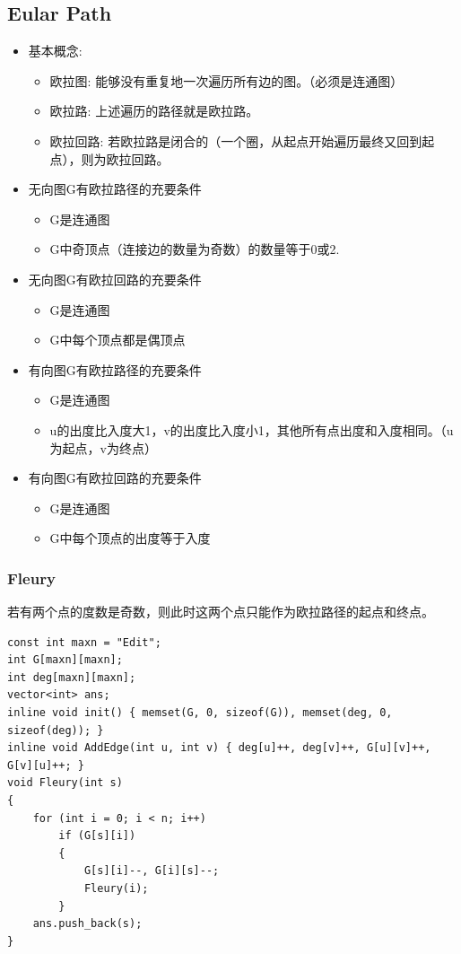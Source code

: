 \documentclass[twoside]{article}
\begin{document}
\subsection{Eular Path}
\begin{itemize}
\item  基本概念:
    \begin{itemize}
    \item 欧拉图: 能够没有重复地一次遍历所有边的图。（必须是连通图）
    \item 欧拉路: 上述遍历的路径就是欧拉路。
    \item 欧拉回路: 若欧拉路是闭合的（一个圈，从起点开始遍历最终又回到起点），则为欧拉回路。
    \end{itemize}
\item 无向图G有欧拉路径的充要条件
    \begin{itemize}
    \item G是连通图
    \item G中奇顶点（连接边的数量为奇数）的数量等于0或2.
    \end{itemize}
\item 无向图G有欧拉回路的充要条件
    \begin{itemize}
    \item G是连通图
    \item G中每个顶点都是偶顶点
    \end{itemize}
\item 有向图G有欧拉路径的充要条件
    \begin{itemize}
    \item G是连通图
    \item u的出度比入度大1，v的出度比入度小1，其他所有点出度和入度相同。（u为起点，v为终点）
    \end{itemize}
\item 有向图G有欧拉回路的充要条件
    \begin{itemize}
    \item G是连通图
    \item G中每个顶点的出度等于入度
    \end{itemize}
\end{itemize}

\subsubsection{Fleury}

若有两个点的度数是奇数，则此时这两个点只能作为欧拉路径的起点和终点。
\begin{lstlisting}
const int maxn = "Edit";
int G[maxn][maxn];
int deg[maxn][maxn];
vector<int> ans;
inline void init() { memset(G, 0, sizeof(G)), memset(deg, 0, sizeof(deg)); }
inline void AddEdge(int u, int v) { deg[u]++, deg[v]++, G[u][v]++, G[v][u]++; }
void Fleury(int s)
{
    for (int i = 0; i < n; i++)
        if (G[s][i])
        {
            G[s][i]--, G[i][s]--;
            Fleury(i);
        }
    ans.push_back(s);
}
\end{lstlisting}
\end{document}

